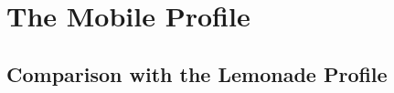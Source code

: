\documentclass[trojita]{subfiles}
\begin{document}
\chapter{The Mobile Profile}

\section{Comparison with the Lemonade Profile}
\label{sec:lemonade-comparison}
\end{document}
